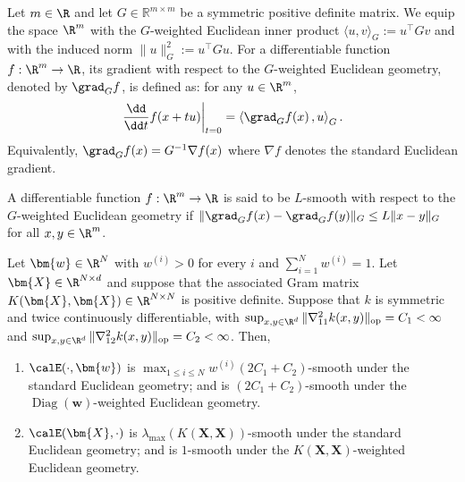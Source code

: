 \begin{defi}\label{defi:weighted_euc}
Let $m\in\R$ and let $G \in \mathbb{R}^{m\times m}$ be a symmetric positive definite matrix. 
We equip the space $\R^m$ with the $G$-weighted Euclidean inner product $\langle u,v\rangle_G := u^\top G v$ and with the induced norm $\|u\|_G^2 := u^\top G u$. 
For a differentiable function $f:\R^m\to\R$, its gradient with respect to the $G$-weighted Euclidean geometry, denoted by $\grad_G f$, is defined as: for any $u\in\R^m$, 
\begin{align*}
    \left.\frac{\dd}{\dd t} f(x+t u)\right|_{t=0} = \left\langle \grad_G f(x)\, , u \right\rangle_G. 
\end{align*}
Equivalently, $\grad_G f(x) = G^{-1}\nabla f(x)$ where $\nabla f$ denotes the standard Euclidean gradient. 
\end{defi}


\begin{defi}[Smoothness]
    A differentiable function $f:\R^m\to\R$ is said to be $L$-smooth with respect to the $G$-weighted Euclidean geometry if $\|\grad_G f(x)-\grad_G f(y)\|_G
    \leq L\|x-y\|_G$ for all $x,y\in\R^m$. 
\end{defi}

\begin{prop}
\label{prop:mmd-energy-smoothness}
Let $\bm{w}\in\R^N$ with $w^{(i)}>0$ for every $i$ and $\sum_{i=1}^N w^{(i)}=1$.
Let $\bm{X}\in\R^{N\times d}$ and suppose that the associated Gram matrix $K(\bm{X},\bm{X})\in\R^{N\times N}$ is positive definite.
Suppose that $k$ is symmetric and twice continuously differentiable, with $\sup_{x,y\in\R^d}\|\nabla_{11}^2 k(x,y)\|_{\mathrm{op}} = C_1<\infty$ and $\sup_{x,y\in\R^d}\|\nabla_{12}^2 k(x,y)\|_{\mathrm{op}}=C_2 <\infty$.
Then,
\begin{enumerate}
    \item $\calE(\cdot,\bm{w})$ is $\max_{1\leq i\leq N} w^{(i)}(2 C_1 + C_2)$-smooth under the standard Euclidean geometry; and is $(2 C_1 + C_2)$-smooth under the $\operatorname{Diag}(\bm{w})$-weighted Euclidean geometry. 
    \item $\calE(\bm{X}, \cdot)$ is $\lambda_{\max}(K(\bm{X}, \bm{X}))$-smooth under the standard Euclidean geometry; and is $1$-smooth under the $K(\bm{X}, \bm{X})$-weighted Euclidean geometry. 
\end{enumerate} 
\end{prop}

